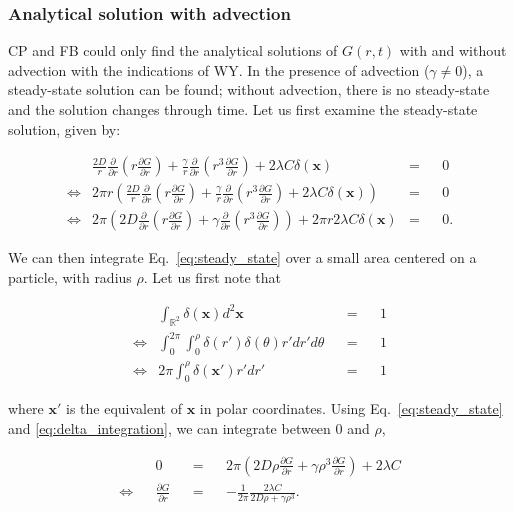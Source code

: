 \subsubsection*{Analytical solution with advection}

CP and FB could only find the analytical solutions of $G(r,t)$ with and without advection with the indications of WY. In the presence of advection ($\gamma\neq0$), a steady-state solution
can be found; without advection, there is no steady-state and the solution changes through time. Let us first examine the steady-state solution, given by:

\begin{align}
  &  \frac{2D}{r}\frac{\partial}{\partial r}\left(r\frac{\partial G}{\partial r}\right)+\frac{\gamma}{r}\frac{\partial}{\partial r}\left(r^{3}\frac{\partial G}{\partial r}\right)+2\lambda C\delta(\boldsymbol{x})\nonumber & = & & 0 \\
\Leftrightarrow & 2\pi r\left(\frac{2D}{r}\frac{\partial}{\partial r}\left(r\frac{\partial G}{\partial r}\right)+\frac{\gamma}{r}\frac{\partial}{\partial r}\left(r^{3}\frac{\partial G}{\partial r}\right)+2\lambda C\delta(\boldsymbol{x})\right)\nonumber & = & & 0 \\
 \Leftrightarrow  & 2\pi\left(2D\frac{\partial}{\partial r}\left(r\frac{\partial G}{\partial r}\right)+\gamma\frac{\partial}{\partial r}\left(r^{3}\frac{\partial G}{\partial r}\right)\right)+2\pi r2\lambda C\delta(\boldsymbol{x}) & = & & 0.\label{eq:steady_state}
\end{align}

We can then integrate Eq.~\ref{eq:steady_state} over a small area centered on a particle, with radius $\rho$. Let us first note that

\begin{align}
& \int_{\mathbb{R}^{2}}\delta(\boldsymbol{x})d^{2}\boldsymbol{x} & & = & & 1\nonumber \\
\Leftrightarrow & \int_{0}^{2\pi}\int_{0}^{\rho}\delta(r')\delta(\theta)r'dr'd\theta & & = & & 1\nonumber \\
\Leftrightarrow & 2\pi\int_{0}^{\rho}\delta(\boldsymbol{x'})r'dr' & & = & & 1\label{eq:delta_integration}
\end{align}

where $\boldsymbol{x'}$ is the equivalent of $\boldsymbol{x}$ in polar coordinates. Using Eq.~\ref{eq:steady_state} and \ref{eq:delta_integration}, we can integrate between 0 and $\rho$, 

\begin{align}
 & & 0 & & = & & 2\pi\left(2D\rho\frac{\partial G}{\partial r}+\gamma\rho^{3}\frac{\partial G}{\partial r}\right)+2\lambda C\nonumber \\
\Leftrightarrow & & \frac{\partial G}{\partial r} & & = & & -\frac{1}{2\pi}\frac{2\lambda C}{2D\rho+\gamma\rho^{3}}.\label{eq:deriv_G_r}
\end{align}

